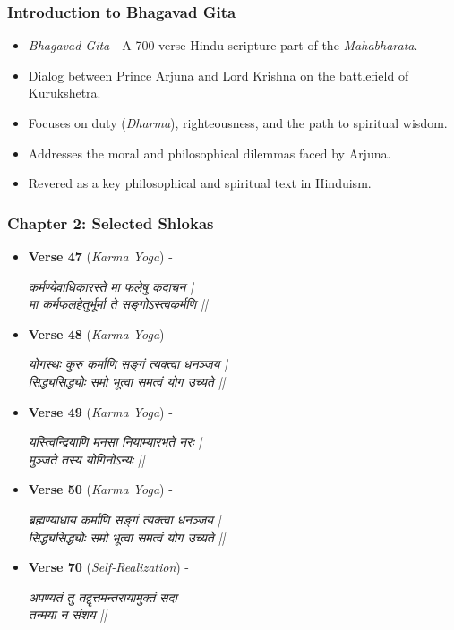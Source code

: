 \begin{frame}[fragile]\frametitle{Introduction to Bhagavad Gita}

      \begin{itemize}
		\item \textit{Bhagavad Gita} - A 700-verse Hindu scripture part of the \textit{Mahabharata}.
		\item Dialog between Prince Arjuna and Lord Krishna on the battlefield of Kurukshetra.
		\item Focuses on duty (\textit{Dharma}), righteousness, and the path to spiritual wisdom.
		\item Addresses the moral and philosophical dilemmas faced by Arjuna.
		\item Revered as a key philosophical and spiritual text in Hinduism.
	  \end{itemize}

\end{frame}

\begin{frame}[fragile]\frametitle{Chapter 2: Selected Shlokas}

      \begin{itemize}
		\item \textbf{Verse 47} (\textit{Karma Yoga}) - 
		
			\textit{कर्मण्येवाधिकारस्ते मा फलेषु कदाचन |} \\
			\textit{मा कर्मफलहेतुर्भूर्मा ते सङ्गोऽस्त्वकर्मणि ||}
		
		\item \textbf{Verse 48} (\textit{Karma Yoga}) - 
		
			\textit{योगस्थः कुरु कर्माणि सङ्गं त्यक्त्वा धनञ्जय |} \\
			\textit{सिद्ध्यसिद्ध्योः समो भूत्वा समत्वं योग उच्यते ||}
		
		\item \textbf{Verse 49} (\textit{Karma Yoga}) - 
		
			\textit{यस्त्विन्द्रियाणि मनसा नियाम्यारभते नरः |} \\
			\textit{मुञ्जते तस्य योगिनोऽन्यः ||}
		
		\item \textbf{Verse 50} (\textit{Karma Yoga}) - 
		
			\textit{ब्रह्मण्याधाय कर्माणि सङ्गं त्यक्त्वा धनञ्जय |} \\
			\textit{सिद्ध्यसिद्ध्योः समो भूत्वा समत्वं योग उच्यते ||}
		
		\item \textbf{Verse 70} (\textit{Self-Realization}) - 
		
			\textit{अपण्यतं तु तद्वृत्तमन्तरायामुक्तं सदा} \\
			\textit{तन्मया न संशय ||}
		
	  \end{itemize}

\end{frame}

